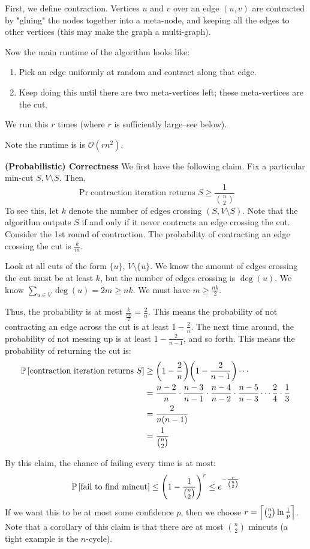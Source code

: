 \begin{algothm}
    First, we define contraction. Vertices $u$ and $v$ over an edge $(u, v)$ are contracted by "gluing" the nodes together into a meta-node, and keeping all the edges to other vertices (this may make the graph a multi-graph).

    Now the main runtime of the algorithm looks like:
    \begin{enumerate}
        \item Pick an edge uniformly at random and contract along that edge.
        \item Keep doing this until there are two meta-vertices left; these meta-vertices are the cut.
    \end{enumerate}
    We run this $r$ times (where $r$ is sufficiently large--see below).
    
    Note the runtime is is $\mathcal{O}(rn^2)$.

    \textbf{(Probabilistic) Correctness}
    We first have the following claim. Fix a particular min-cut $S, V \setminus S$. Then,
    \[ \Pr{\text{contraction iteration returns $S$}} \geq \frac{1}{\binom{n}{2}} \]
    To see this, let $k$ denote the number of edges crossing $(S, V \setminus S)$. Note that the algorithm outputs $S$ if and only if it never contracts an edge crossing the cut.
    Consider the 1st round of contraction. The probability of contracting an edge crossing the cut is $\frac{k}{m}$. 

    Look at all cuts of the form $\{u\}$, $V \setminus \{u\}$. We know the amount of edges crossing the cut must be at least $k$, but the number of edges crossing is $\deg(u)$.
    We know $\sum_{u \in V} \deg(u) = 2m \geq nk$. We must have $m \geq \frac{nk}{2}$.

    Thus, the probability is at most $\frac{k}{\frac{nk}{2}} = \frac{2}{n}$. This means the probability of not contracting an edge across the cut
    is at least $1 - \frac{2}{n}$. The next time around, the probability of not messing up is at least $1 - \frac{2}{n - 1}$, and so forth. This means the probability of returning the cut is:
    \begin{align*}
        \mathbb{P}\left[ \text{contraction iteration returns $S$} \right] &\geq \qty(1 - \frac{2}{n}) \qty(1 - \frac{2}{n - 1}) \cdots \\
        &= \frac{n - 2}{n} \cdot \frac{n - 3}{n - 1} \cdot \frac{n - 4}{n - 2} \cdot \frac{n - 5}{n - 3} \cdots \frac{2}{4} \cdot \frac{1}{3} \\
        &= \frac{2}{n(n-1)} \\
        &= \frac{1}{\binom{n}{2}}
    \end{align*}

    By this claim,    
    the chance of failing every time is at most:
    \[ \mathbb{P}\left[ \text{fail to find mincut} \right] \leq \qty(1 - \frac{1}{\binom{n}{2}})^r \leq e^{-\frac{r}{\binom{n}{2}}}\]
    If we want this to be at most some confidence $p$, then we choose $r = \left\lceil \binom{n}{2} \ln \frac{1}{p} \right\rceil$.
    Note that a corollary of this claim is that there are at most $\binom{n}{2}$ mincuts (a tight example is the $n$-cycle).

\end{algothm}
